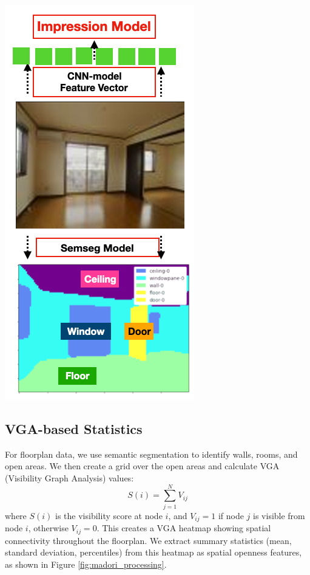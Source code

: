 \documentclass[11pt,a4paper]{article}
\begin{document}
\begin{multicols}{2}
\begin{center}
    \includegraphics[width=0.6\columnwidth,height=1\columnwidth]{plots/exp_lv_semseg_4.png}
    \label{fig:interior_semseg}
\end{center}

\subsection{VGA-based Statistics}
For floorplan data, we use semantic segmentation to identify walls, rooms, and open areas. 
We then create a grid over the open areas and calculate VGA (Visibility Graph Analysis) values:
\begin{equation}
\label{eq:vga_definition}
S(i) = \sum_{j=1}^{N} V_{ij}
\end{equation}
where $S(i)$ is the visibility score at node $i$, and $V_{ij} = 1$ if node $j$ is visible from node $i$, otherwise $V_{ij} = 0$. 
This creates a VGA heatmap showing spatial connectivity throughout the floorplan. We extract summary statistics 
(mean, standard deviation, percentiles) from this heatmap as spatial openness features, as shown in Figure \ref{fig:madori_processing}.
\vspace{1em}


\end{multicols}
\end{document}
